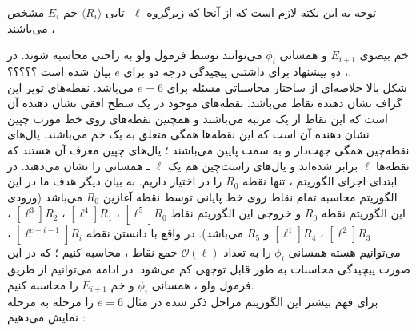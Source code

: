 توجه به این نکته لازم است که از آنجا که زیرگروه 
$\ell$
-تابی 
$\langle R_i \rangle $
خم 
$E_i$
مشخص می‌باشند ، 

خم بیضوی 
$E_{i+1}$
و همسانی
$\phi_i$
می‌توانند توسط فرمول ولو 
\cite{velu}
به راحتی محاسبه شوند.
در 
\cite{jao2011towards}
، دو پیشنهاد برای داشتنی پیچیدگی درجه دو برای 
$e$
بیان شده است  ؟؟؟؟؟.
\\
شکل بالا خلاصه‌ای از ساختار محاسباتی مسئله برای 
$e = 6$
می‌باشد. نقطه‌های توپر این گراف نشان دهنده نقاط می‌باشد. نقطه‌های موجود در یک سطح افقی نشان دهنده آن است که این نقاط از یک مرتبه می‌باشند و همچنین نقطه‌های روی خط مورب چپین نشان دهنده آن است که این نقطه‌ها همگی متعلق به یک خم می‌باشند. یال‌های نقطه‌چین همگی جهت‌دار و به سمت پایین می‌باشند ؛ یال‌های چپین معرف آن هستند که نقطه‌ها 
$\ell$
برابر شده‌اند و یال‌های راست‌چین هم یک 
$\ell$
ـ همسانی را نشان می‌دهند.
در ابتدای اجرای الگوریتم ، تنها نقطه 
$R_0$
را در اختیار داریم. به بیان دیگر هدف ما در این الگوریتم  محاسبه تمام نقاط روی خط پایانی توسط نقطه آغازین 
$R_0$
می‌باشد (ورودی این الگوریتم نقطه 
$R_0$
و خروجی این الگوریتم نقاط 
$[\ell^5]R_0$
،
$[\ell^4]R_1$
،
$[\ell^3]R_2$
،
$[\ell^2]R_3$
،
$[\ell^1]R_4$
و
$R_5$
می‌باشد).
در واقع با دانستن نقطه 
$[\ell^{e-i-1}]R_i$
، می‌توانیم هسته همسانی
$\phi_i$
را به تعداد
$\mathcal{O}(\ell)$
جمع نقاط ، محاسبه کنیم ؛ که در این صورت پیچیدگی محاسبات به طور قابل توجهی کم می‌شود. در ادامه می‌توانیم از طریق فرمول ولو ، همسانی 
$\phi_i$
و خم 
$E_{i+1}$
را محاسبه کنیم. 
\\
برای فهم بیشتر این الگوریتم مراحل ذکر شده در مثال 
$e=6$
را مرحله به مرحله نمایش می‌دهیم :
